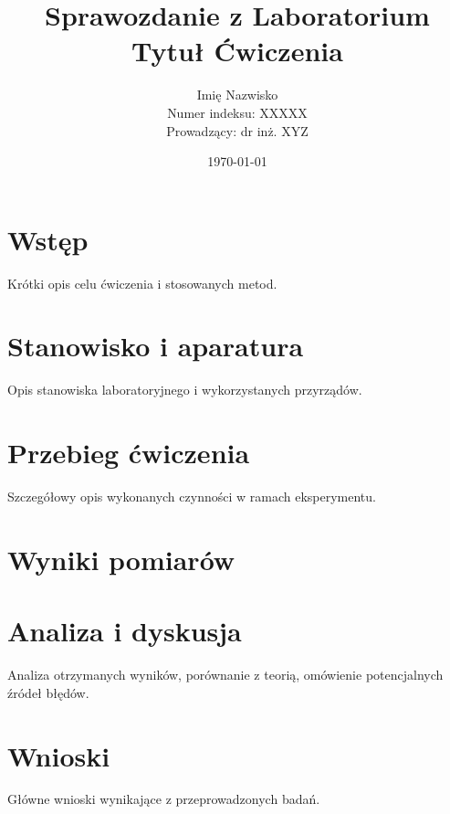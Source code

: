 \documentclass[a4paper,12pt]{article}
\title{Sprawozdanie z Laboratorium \\[1ex] \large Tytuł Ćwiczenia}
\author{Imię Nazwisko \\ Numer indeksu: XXXXX \\ Prowadzący: dr inż. XYZ}
\date{\today}
\begin{document}
\maketitle

\section{Wstęp}
Krótki opis celu ćwiczenia i stosowanych metod.

\section{Stanowisko i aparatura}
Opis stanowiska laboratoryjnego i wykorzystanych przyrządów.

\section{Przebieg ćwiczenia}
Szczegółowy opis wykonanych czynności w ramach eksperymentu.

\section{Wyniki pomiarów}


\section{Analiza i dyskusja}
Analiza otrzymanych wyników, porównanie z teorią, omówienie potencjalnych źródeł błędów.

\section{Wnioski}
Główne wnioski wynikające z przeprowadzonych badań.
\end{document}
